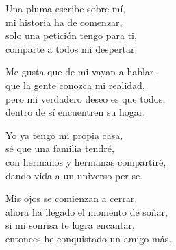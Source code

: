 \begin{center}
\vspace{3em} 
Una pluma escribe sobre mí,\\ 
mi historia ha de comenzar,\\ 
solo una petición tengo para ti,\\ 
comparte a todos mi despertar.

\vspace{1em} 
Me gusta que de mi vayan a hablar,\\ 
que la gente conozca mi realidad,\\ 
pero mi verdadero deseo es que todos,\\ 
dentro de sí encuentren su hogar.

\vspace{1em} 
Yo ya tengo mi propia casa,\\ 
sé que una familia tendré,\\ 
con hermanos y hermanas compartiré,\\ 
dando vida a un universo per se.

\vspace{1em} 
Mis ojos se comienzan a cerrar,\\ 
ahora ha llegado el momento de soñar,\\ 
si mi sonrisa te logra encantar,\\ 
entonces he conquistado un amigo más.


\end{center}




